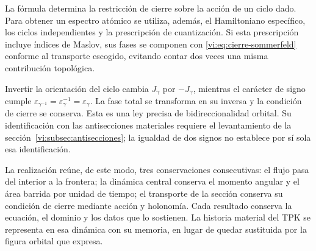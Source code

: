 La fórmula determina la restricción de cierre sobre la
acción de un ciclo dado. Para obtener un espectro atómico
se utiliza, además, el Hamiltoniano específico, los ciclos
independientes y la prescripción de cuantización. Si esta
prescripción incluye índices de Maslov, sus fases se
componen con \eqref{vi:eq:cierre-sommerfeld} conforme al
transporte escogido, evitando contar dos veces una misma
contribución topológica.

Invertir la orientación del ciclo cambia $J_\gamma$ por
$-J_\gamma$, mientras el carácter de signo cumple
$\varepsilon_{\gamma^{-1}}=\varepsilon_\gamma^{-1}
=\varepsilon_\gamma$. La fase total se transforma en su
inversa y la condición de cierre se conserva. Esta es una
ley precisa de bidireccionalidad orbital. Su identificación
con las antisecciones materiales requiere el levantamiento
de la sección~\ref{vi:subsec:antisecciones}; la igualdad
de dos signos no establece por sí sola esa identificación.

La realización reúne, de este modo, tres conservaciones
consecutivas: el flujo pasa del interior a la frontera;
la dinámica central conserva el momento angular y el área
barrida por unidad de tiempo; el transporte de la sección
conserva su condición de cierre mediante acción y
holonomía. Cada resultado conserva la ecuación, el dominio
y los datos que lo sostienen. La historia material del
TPK se representa en esa dinámica con su memoria, en lugar
de quedar sustituida por la figura orbital que expresa.
